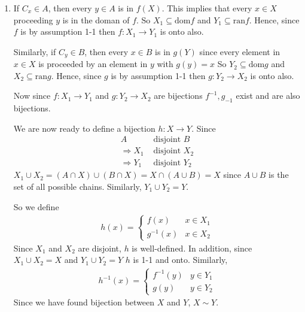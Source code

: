 \begin{enumerate}[label=(\alph*)]
    \item 
    If $C_x \in  A$, then every $y\in A$ is in $f(X)$. This implies that every $x\in X$
    proceeding $y$ is in the doman of $f$.
    So $X_1 \subseteq \text{dom} f$ and $Y_1 \subseteq \text{ran} f$. Hence, since $f$ is
    by assumption 1-1 then $f: X_1 \rightarrow Y_1$ is onto also.

    Similarly, if $C_y \in  B$, then every $x\in B$ is in $g(Y)$ since every element in $x\in X$
    is proceeded by an element in $y$ with $g(y)=x$
    So $Y_2 \subseteq \text{dom} g$ and $X_2 \subseteq \text{ran} g$. Hence, since $g$ is
    by assumption 1-1 then $g: Y_2 \rightarrow X_2$ is onto also.

    Now since $f:X_1 \rightarrow Y_1$ and $g: Y_2 \rightarrow X_2$ are bijections $f^{-1}, g_{-1}$
    exist and are also bijections. 
    
    We are now ready to define a bijection $h: X \rightarrow Y$. Since
    \begin{align*}
        A &\text{ disjoint } B \\
       \Rightarrow X_1 &\text{ disjoint } X_2 \\
       \Rightarrow Y_1 &\text{ disjoint } Y_2
    \end{align*}
    $X_1 \cup X_2 = (A \cap X) \cup (B \cap X) = X \cap (A \cup B) = X$ since $A \cup B$ is the
    set of all possible chains. Similarly, $Y_1 \cup Y_2 = Y$.

    So we define 
    \begin{align*}
        h(x) = 
        \begin{cases}
            f(x) & x \in X_1 \\
            g^{-1}(x) & x \in X_2
        \end{cases}
    \end{align*}
    Since $X_1$ and $X_2$ are disjoint, $h$ is well-defined. In addition, since $X_1 \cup X_2 = X$
    and $Y_1 \cup Y_2 = Y$ $h$ is 1-1 and onto. Similarly,
    \begin{align*}
        h^{-1}(x) = 
        \begin{cases}
            f^{-1}(y) & y \in Y_1 \\
            g(y) & y \in Y_2
        \end{cases}
    \end{align*}
    Since we have found bijection between $X$ and $Y$, $X \sim Y$.

\end{enumerate}
